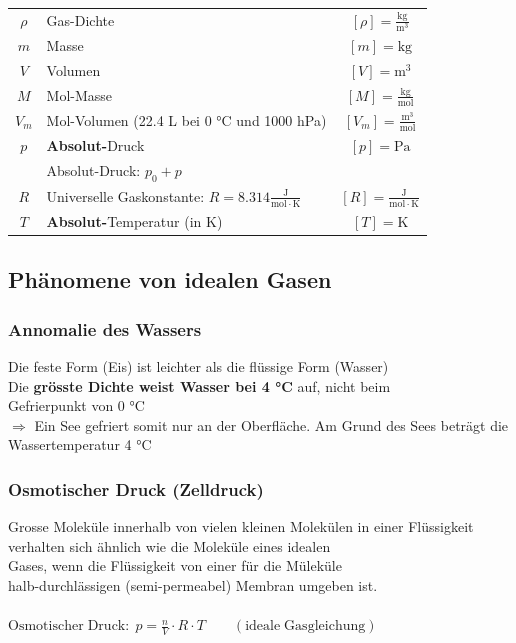 \begin{tabular}{c l c}
	\rule{0pt}{8pt}$\rho$ & Gas-Dichte & $[\rho] = \mathrm{\frac{kg}{m^3}}$ \\
	$m$ & Masse & $[m] = \mathrm{kg}$ \\
	$V$ & Volumen & $[V] = \mathrm{m^3}$ \\
	\rule{0pt}{8pt}$M$ & Mol-Masse & $[M] = \mathrm{\frac{kg}{mol}}$ \\
	\rule{0pt}{8pt}$V_m$ & Mol-Volumen (22.4 L bei 0 °C und 1000 hPa) & $[V_m] = \mathrm{\frac{m^3}{mol}}$ \\
	\rule{0pt}{8pt}$p$ & \textbf{Absolut-}Druck & $[p] = \mathrm{Pa}$ \\
	    & Absolut-Druck: $p_0 + p$ & \\
	\rule{0pt}{8pt}$R$ & Universelle Gaskonstante: $R = 8.314 \mathrm{\frac{J}{mol \cdot K}}$ & $[R] = \mathrm{\frac{J}{mol \cdot K}} $ \\
	$T$ & \textbf{Absolut-}Temperatur (in K) & $[T] = \mathrm{K}$ \\
\end{tabular}



\subsection{Phänomene von idealen Gasen}

\subsubsection{Annomalie des Wassers}
Die feste Form (Eis) ist leichter als die flüssige Form (Wasser) \\
Die \textbf{grösste Dichte weist Wasser bei 4 °C} auf, nicht beim \\
 Gefrierpunkt von 0 °C \\

$\Rightarrow$ Ein See gefriert somit nur an der Oberfläche. Am Grund des Sees beträgt die Wassertemperatur 4 °C 


\subsubsection{Osmotischer Druck (Zelldruck)}

Grosse Moleküle innerhalb von vielen kleinen Molekülen in einer Flüssigkeit verhalten sich ähnlich wie die Moleküle eines idealen \\ Gases, wenn die Flüssigkeit von einer für die Müleküle \\
halb-durchlässigen (semi-permeabel) Membran umgeben ist.\\
\\
$ \mathrm{Osmotischer \; Druck:} \; p = \frac{n}{V} \cdot R \cdot T  \qquad \mathrm{(ideale \; Gasgleichung)}$


